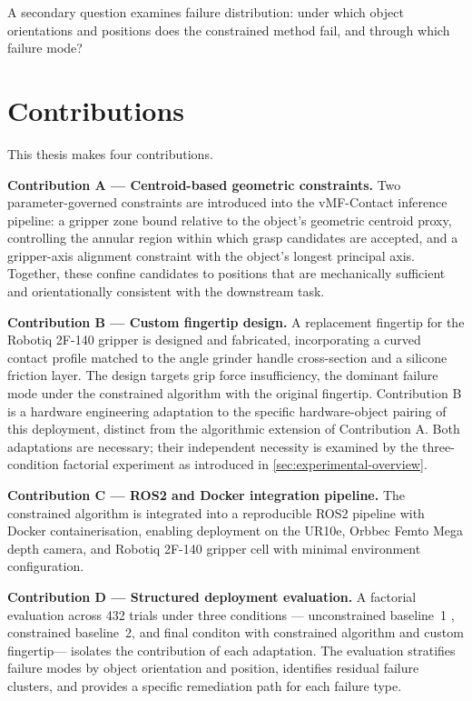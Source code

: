 \documentclass[12pt, a4paper]{report}
\begin{document}
A secondary question examines failure distribution: under which object orientations and positions does the constrained method fail, and through which failure mode?

\section{Contributions}
\label{sec:contributions}

This thesis makes four contributions.

\textbf{Contribution A --- Centroid-based geometric constraints.} Two parameter-governed constraints are introduced into the vMF-Contact inference pipeline: a gripper zone bound relative to the object's geometric centroid proxy, controlling the annular region within which grasp candidates are accepted, and a gripper-axis alignment constraint with the object's longest principal axis. Together, these confine candidates to positions that are mechanically sufficient and orientationally consistent with the downstream task.

\textbf{Contribution B --- Custom fingertip design.} A replacement fingertip for the Robotiq 2F-140 gripper is designed and fabricated, incorporating a curved contact profile matched to the angle grinder handle cross-section and a silicone friction layer. The design targets grip force insufficiency, the dominant failure mode under the constrained algorithm with the original fingertip. Contribution B is a hardware engineering adaptation to the specific hardware-object pairing of this deployment, distinct from the algorithmic extension of Contribution A. Both adaptations are necessary; their independent necessity is examined by the three-condition factorial experiment as introduced in \cref{sec:experimental-overview}.

\textbf{Contribution C --- ROS2 and Docker integration pipeline.} The constrained algorithm is integrated into a reproducible ROS2 pipeline with Docker containerisation, enabling deployment on the UR10e, Orbbec Femto Mega depth camera, and Robotiq 2F-140 gripper cell with minimal environment configuration.

\textbf{Contribution D --- Structured deployment evaluation.} A factorial evaluation across 432 trials under three conditions --- unconstrained baseline~1 , constrained baseline~2, and final conditon with constrained algorithm and custom fingertip--- isolates the contribution of each adaptation. The evaluation stratifies failure modes by object orientation and position, identifies residual failure clusters, and provides a specific remediation path for each failure type.
\end{document}
